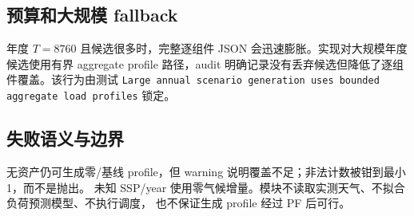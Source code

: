 \subsection{预算和大规模 fallback}
年度 $T=8760$ 且候选很多时，完整逐组件 JSON 会迅速膨胀。实现对大规模年度候选使用有界
aggregate profile 路径，audit 明确记录没有丢弃候选但降低了逐组件覆盖。该行为由测试
\texttt{Large annual scenario generation uses bounded aggregate load profiles} 锁定。

\subsection{失败语义与边界}
无资产仍可生成零/基线 profile，但 warning 说明覆盖不足；非法计数被钳到最小 1，而不是抛出。
未知 SSP/year 使用零气候增量。模块不读取实测天气、不拟合负荷预测模型、不执行调度，
也不保证生成 profile 经过 PF 后可行。
